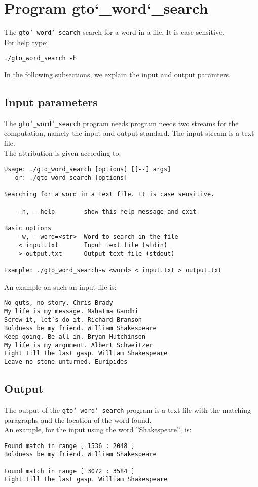 \section{Program gto\char`_word\char`_search}
The \texttt{gto\char`_word\char`_search} search for a word in a file. It is case sensitive.\\
For help type:
\begin{lstlisting}
./gto_word_search -h
\end{lstlisting}
In the following subsections, we explain the input and output paramters.

\subsection*{Input parameters}

The \texttt{gto\char`_word\char`_search} program needs program needs two streams for the computation, namely the input and output standard. The input stream is a text file.\\
The attribution is given according to:
\begin{lstlisting}
Usage: ./gto_word_search [options] [[--] args]
   or: ./gto_word_search [options]

Searching for a word in a text file. It is case sensitive.

    -h, --help        show this help message and exit

Basic options
    -w, --word=<str>  Word to search in the file
    < input.txt       Input text file (stdin)
    > output.txt      Output text file (stdout)

Example: ./gto_word_search-w <word> < input.txt > output.txt
\end{lstlisting}
An example on such an input file is:
\begin{lstlisting}
No guts, no story. Chris Brady
My life is my message. Mahatma Gandhi
Screw it, let’s do it. Richard Branson
Boldness be my friend. William Shakespeare
Keep going. Be all in. Bryan Hutchinson
My life is my argument. Albert Schweitzer
Fight till the last gasp. William Shakespeare
Leave no stone unturned. Euripides
\end{lstlisting}

\subsection*{Output}
The output of the \texttt{gto\char`_word\char`_search} program is a text file with the matching paragraphs and the location of the word found.\\
An example, for the input using the word ''Shakespeare'', is:
\begin{lstlisting}
Found match in range [ 1536 : 2048 ]
Boldness be my friend. William Shakespeare

Found match in range [ 3072 : 3584 ]
Fight till the last gasp. William Shakespeare
\end{lstlisting}